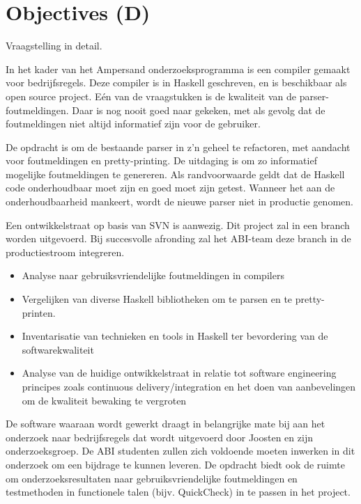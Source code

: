
\section{Objectives (D)}
\label{sec:objectives}
Vraagstelling in detail.

In het kader van het Ampersand onderzoeksprogramma is een compiler gemaakt voor bedrijfsregels. Deze compiler is in Haskell geschreven, en is beschikbaar als open source project. Eén van de vraagstukken is de kwaliteit van de parser-foutmeldingen. Daar is nog nooit goed naar gekeken, met als gevolg dat de foutmeldingen niet altijd informatief zijn voor de gebruiker.

De opdracht is om de bestaande parser in z’n geheel te refactoren, met aandacht voor foutmeldingen en pretty-printing. De uitdaging is om zo informatief mogelijke foutmeldingen te genereren. Als randvoorwaarde geldt dat de Haskell code onderhoudbaar moet zijn en goed moet zijn getest. Wanneer het aan de onderhoudbaarheid mankeert, wordt de nieuwe parser niet in productie genomen.

Een ontwikkelstraat op basis van SVN is aanwezig. Dit project zal in een branch worden uitgevoerd. Bij succesvolle afronding zal het ABI-team deze branch in de productiestroom integreren.

\begin{itemize}
\item Analyse naar gebruiksvriendelijke foutmeldingen in compilers 
\item Vergelijken van diverse Haskell bibliotheken om te parsen en te pretty-printen. 
\item Inventarisatie van technieken en tools in Haskell ter bevordering van de software\-kwaliteit 
\item Analyse van de huidige ontwikkelstraat in relatie tot software engineering principes zoals continuous delivery/integration en het doen van aanbevelingen om de kwaliteit bewaking te vergroten 
\end{itemize}

De software waaraan wordt gewerkt draagt in belangrijke mate bij aan het onderzoek naar bedrijfsregels dat wordt uitgevoerd door Joosten en zijn onderzoeksgroep. De ABI studenten zullen zich voldoende moeten inwerken in dit onderzoek om een bijdrage te kunnen leveren. De opdracht biedt ook de ruimte om onderzoeksresultaten naar gebruiksvriendelijke foutmeldingen en testmethoden in functionele talen (bijv. QuickCheck) in te passen in het project.

